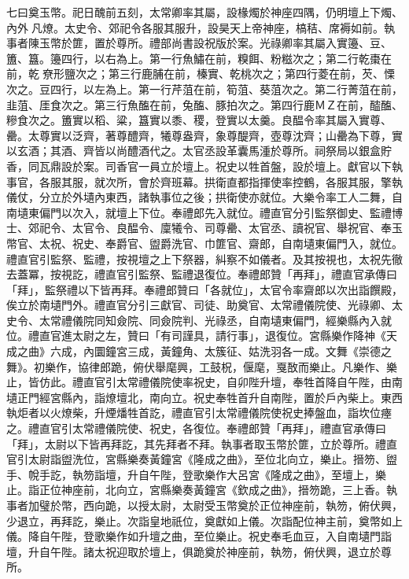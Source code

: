 \begin{pinyinscope}
 七曰奠玉幣。祀日醜前五刻，太常卿率其屬，設椽燭於神座四隅，仍明壇上下燭、內外凡燎。太史令、郊祀令各服其服升，設昊天上帝神座，槁秸、席褥如前。執事者陳玉幣於篚，置於尊所。禮部尚書設祝版於案。光祿卿率其屬入實籩、豆、簠、簋。籩四行，以右為上。第一行魚鱐在前，糗餌、粉糍次之；第二行乾棗在前，乾尞形鹽次之；第三行鹿脯在前，榛實、乾桃次之；第四行菱在前，芡、慄次之。豆四行，以左為上。第一行芹菹在前，筍菹、葵菹次之。第二行菁菹在前，韭菹、厓食次之。第三行魚醢在前，兔醢、豚拍次之。第四行鹿ＭＺ在前，醓醢、糝食次之。簠實以稻、粱，簋實以黍、稷，登實以太羹。良醖令率其屬入實尊、罍。太尊實以泛齊，著尊醴齊，犧尊盎齊，象尊醍齊，壺尊沈齊；山罍為下尊，實以玄酒；其酒、齊皆以尚醴酒代之。太官丞設革囊馬湩於尊所。祠祭局以銀盒貯香，同瓦鼎設於案。司香官一員立於壇上。祝史以牲首盤，設於壇上。獻官以下執事官，各服其服，就次所，會於齊班幕。拱衛直都指揮使率控鶴，各服其服，擎執儀仗，分立於外壝內東西，諸執事位之後；拱衛使亦就位。大樂令率工人二舞，自南壝東偏門以次入，就壇上下位。奉禮郎先入就位。禮直官分引監祭御史、監禮博士、郊祀令、太官令、良醖令、廩犧令、司尊罍、太官丞、讀祝官、舉祝官、奉玉幣官、太祝、祝史、奉爵官、盥爵洗官、巾篚官、齋郎，自南壝東偏門入，就位。禮直官引監祭、監禮，按視壇之上下祭器，糾察不如儀者。及其按視也，太祝先徹去蓋冪，按視訖，禮直官引監祭、監禮退復位。奉禮郎贊「再拜」，禮直官承傳曰「拜」，監祭禮以下皆再拜。奉禮郎贊曰「各就位」，太官令率齋郎以次出詣饌殿，俟立於南壝門外。禮直官分引三獻官、司徒、助奠官、太常禮儀院使、光祿卿、太史令、太常禮儀院同知僉院、同僉院判、光祿丞，自南壝東偏門，經樂縣內入就位。禮直官進太尉之左，贊曰「有司謹具，請行事」，退復位。宮縣樂作降神《天成之曲》六成，內圜鐘宮三成，黃鐘角、太簇征、姑洗羽各一成。文舞《崇德之舞》。初樂作，協律郎跪，俯伏舉麾興，工鼓柷，偃麾，戛敔而樂止。凡樂作、樂止，皆仿此。禮直官引太常禮儀院使率祝史，自卯陛升壇，奉牲首降自午陛，由南壝正門經宮縣內，詣燎壇北，南向立。祝史奉牲首升自南陛，置於戶內柴上。東西執炬者以火燎柴，升煙燔牲首訖，禮直官引太常禮儀院使祝史捧盤血，詣坎位瘞之。禮直官引太常禮儀院使、祝史，各復位。奉禮郎贊「再拜」，禮直官承傳曰「拜」，太尉以下皆再拜訖，其先拜者不拜。執事者取玉幣於篚，立於尊所。禮直官引太尉詣盥洗位，宮縣樂奏黃鐘宮《隆成之曲》，至位北向立，樂止。搢笏、盥手、帨手訖，執笏詣壇，升自午陛，登歌樂作大呂宮《隆成之曲》，至壇上，樂止。詣正位神座前，北向立，宮縣樂奏黃鐘宮《欽成之曲》，搢笏跪，三上香。執事者加璧於幣，西向跪，以授太尉，太尉受玉幣奠於正位神座前，執笏，俯伏興，少退立，再拜訖，樂止。次詣皇地祇位，奠獻如上儀。次詣配位神主前，奠幣如上儀。降自午陛，登歌樂作如升壇之曲，至位樂止。祝史奉毛血豆，入自南壝門詣壇，升自午陛。諸太祝迎取於壇上，俱跪奠於神座前，執笏，俯伏興，退立於尊所。




\end{pinyinscope}
